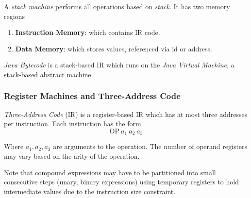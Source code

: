\begin{definition}
    A \textit{stack machine} performs all operations based on \textit{stack}. It has two memory regions
    \begin{enumerate}
        \item \textbf{Instruction Memory}: which contains IR code.
        \item \textbf{Data Memory}: which stores values, referenced via id or address.
    \end{enumerate}
\end{definition}

\begin{example}
    \textit{Java Bytecode} is a stack-based IR which runs on the \textit{Java Virtual Machine}, a stack-based abstract machine.
\end{example}

\subsubsection{Register Machines and Three-Address Code}

\begin{definition}
    \textit{Three-Address Code} (IR) is a register-based IR which has at most three addresses per instruction. Each instruction has the form
    \begin{equation}
        \mathrm{OP}\ a_{1}\ a_{2}\ a_{3}
    \end{equation}
    
    Where $a_1, a_2, a_3$ are arguments to the operation. The number of operand registers may vary based on the arity of the operation.
    
    Note that compound expressions may have to be partitioned into small consecutive steps (unary, binary expressions) using temporary registers to hold intermediate values due to the instruction size constraint.
\end{definition}


